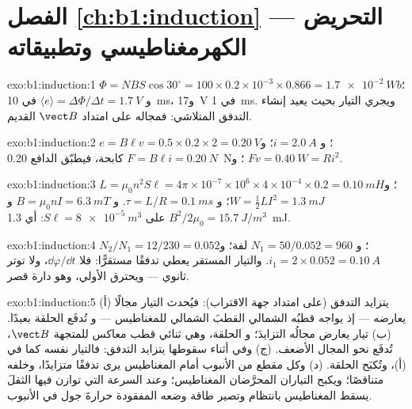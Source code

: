 \section*{الفصل \ref{ch:b1:induction} --- التحريض الكهرمغناطيسي وتطبيقاته}

\begin{solution}{exo:b1:induction:1}
$\Phi = NBS\cos30^\circ = 100 \times 0.2 \times 10^{-3} \times 0.866 = \qty{1.7e-2}{Wb}$؛
و $\langle e\rangle = \Delta\Phi/\Delta t = \qty{1.7}{V}$ في \qty{10}{ms}، و\qty{17}{V} في
\qty{1}{ms}. ويجري التيار بحيث يعيد إنشاء التدفق المتلاشي: فمجاله
على امتداد $\vect B$ القديم.
\end{solution}

\begin{solution}{exo:b1:induction:2}
$e = B\ell v = 0.5 \times 0.2 \times 2 = \qty{0.20}{V}$؛ و $i = \qty{2.0}{A}$؛ و $F = B\ell i =
\qty{0.20}{N}$ كابحة، فيطبّق الدافع \qty{0.20}{N}؛ و $Fv = \qty{0.40}{W}
= Ri^2$.
\end{solution}

\begin{solution}{exo:b1:induction:3}
$L = \mu_0n^2S\ell = 4\pi \times 10^{-7} \times 10^6 \times 4 \times 10^{-4} \times 0.2 =
\qty{0.10}{mH}$؛ و $W = \tfrac12LI^2 = \qty{1.3}{mJ}$؛ و $\tau = L/R = \qty{0.1}{ms}$.
و $B = \mu_0nI = \qty{6.3}{mT}$ و $B^2/2\mu_0 = \qty{15.7}{J/m^3}$ على
$S\ell = \qty{8e-5}{m^3}$: أي \qty{1.3}{mJ}.
\end{solution}

\begin{solution}{exo:b1:induction:4}
$N_2/N_1 = 12/230 = 0.052$؛ و $N_1 = 50/0.052 = 960$ لفة؛ و $i_1 = 2 \times 0.052 =
\qty{0.10}{A}$. والتيار المستقر يعطي تدفقًا مستقرًّا: فلا $\dd\varphi/\dd t$، ولا
توتر ثانوي --- ويحترق الأولي، وهو دارة قصر.
\end{solution}

\begin{solution}{exo:b1:induction:5}
(أ) يتزايد التدفق (على امتداد جهة الاقتراب): فيُحدث التيار مجالًا
يعارضه --- إذ يواجه قطبُه الشمالي القطبَ الشمالي للمغناطيس --- و
تُدفَع الحلقة بعيدًا. (ب) تيار يعارض مجالُه التزايدَ؛ و
الحلقة، وهي ثنائي قطب معاكس للمتجهة $\vect B$، تُدفَع نحو المجال
الأضعف. (ج) وفي أثناء سقوطها يتزايد التدفق: فالتيار نفسه كما في (أ)، وتُكبَح
الحلقة. (د) وكل مقطع من الأنبوب أمام المغناطيس يرى تدفقًا متزايدًا،
وخلفه متناقصًا؛ ويكبح التياران المحرَّضان المغناطيس؛ وعند
السرعة التي توازن فيها  الثقلَ يسقط المغناطيس
بانتظام وتصير طاقة وضعه المفقودة حرارةَ جول في الأنبوب.
\end{solution}

